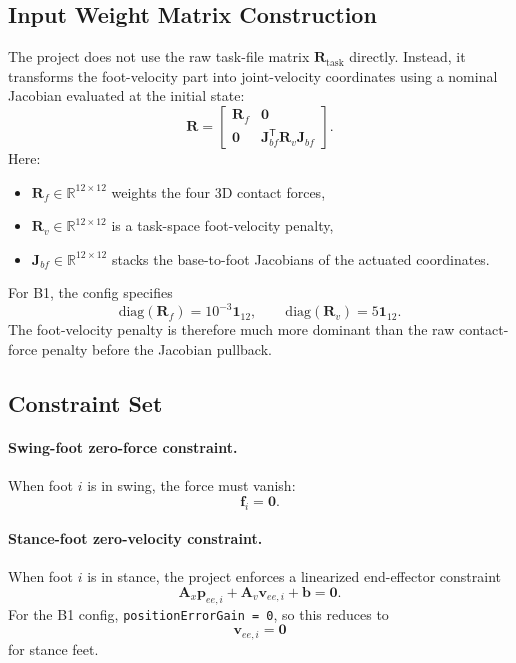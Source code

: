 \documentclass[11pt,a4paper]{article}
\newcommand{\R}{\mathbb{R}}
\newcommand{\vect}[1]{\bm{#1}}
\newcommand{\mat}[1]{\bm{#1}}
\newcommand{\trans}{^{\mathsf T}}
\newcommand{\code}[1]{\texttt{#1}}
\begin{document}
\subsection{Input Weight Matrix Construction}
The project does not use the raw task-file matrix \(\mat{R}_{\mathrm{task}}\) directly. Instead, it transforms the foot-velocity part into joint-velocity coordinates using a nominal Jacobian evaluated at the initial state:
\begin{equation}
\mat{R} =
\begin{bmatrix}
\mat{R}_{f} & \mat{0} \\
\mat{0} & \mat{J}_{bf}\trans \mat{R}_{v} \mat{J}_{bf}
\end{bmatrix}.
\end{equation}
Here:
\begin{itemize}[leftmargin=*]
\item $\mat{R}_{f} \in \R^{12 \times 12}$ weights the four 3D contact forces,
\item $\mat{R}_{v} \in \R^{12 \times 12}$ is a task-space foot-velocity penalty,
\item $\mat{J}_{bf} \in \R^{12 \times 12}$ stacks the base-to-foot Jacobians of the actuated coordinates.
\end{itemize}

For B1, the config specifies
\begin{equation}
\mathrm{diag}(\mat{R}_{f}) = 10^{-3}\mathbf{1}_{12},
\qquad
\mathrm{diag}(\mat{R}_{v}) = 5 \mathbf{1}_{12}.
\end{equation}
The foot-velocity penalty is therefore much more dominant than the raw contact-force penalty before the Jacobian pullback.

\subsection{Constraint Set}
\paragraph{Swing-foot zero-force constraint.}
When foot $i$ is in swing, the force must vanish:
\begin{equation}
\vect{f}_i = \vect{0}.
\end{equation}

\paragraph{Stance-foot zero-velocity constraint.}
When foot $i$ is in stance, the project enforces a linearized end-effector constraint
\begin{equation}
\mat{A}_x \vect{p}_{ee,i} + \mat{A}_v \vect{v}_{ee,i} + \vect{b} = \vect{0}.
\end{equation}
For the B1 config, \code{positionErrorGain = 0}, so this reduces to
\begin{equation}
\vect{v}_{ee,i} = \vect{0}
\end{equation}
for stance feet.
\end{document}
